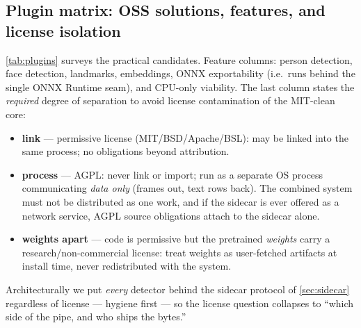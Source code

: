 \documentclass[11pt]{article}
\theoremstyle{definition}
\begin{document}
\subsection{Plugin matrix: OSS solutions, features, and license isolation}
\label{sec:pluginmatrix}

\autoref{tab:plugins} surveys the practical candidates. Feature columns:
person detection, face detection, landmarks, embeddings, ONNX
exportability (i.e.\ runs behind the single ONNX Runtime seam), and
CPU-only viability. The last column states the \emph{required} degree of
separation to avoid license contamination of the MIT-clean core:
\begin{itemize}
  \item \textbf{link} --- permissive license (MIT/BSD/Apache/BSL): may be
        linked into the same process; no obligations beyond attribution.
  \item \textbf{process} --- AGPL: never link or import; run as a
        separate OS process communicating \emph{data only} (frames out,
        text rows back). The combined system must not be distributed as
        one work, and if the sidecar is ever offered as a network
        service, AGPL source obligations attach to the sidecar alone.
  \item \textbf{weights apart} --- code is permissive but the pretrained
        \emph{weights} carry a research/non-commercial license: treat
        weights as user-fetched artifacts at install time, never
        redistributed with the system.
\end{itemize}
Architecturally we put \emph{every} detector behind the sidecar protocol
of \autoref{sec:sidecar} regardless of license --- hygiene first --- so
the license question collapses to ``which side of the pipe, and who
ships the bytes.''
\end{document}
